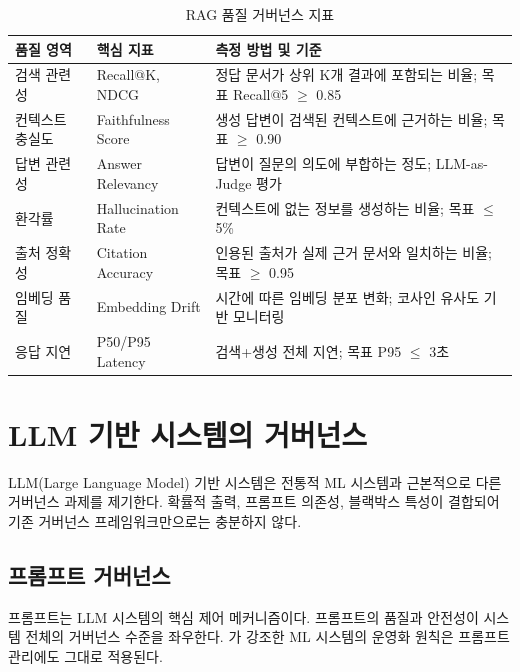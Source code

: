\begin{table}[htbp]
\centering
\caption{RAG 품질 거버넌스 지표}
\label{tab:rag_quality_metrics}
\begin{tabularx}{\textwidth}{p{3cm}p{3cm}X}
\toprule
\textbf{품질 영역} & \textbf{핵심 지표} & \textbf{측정 방법 및 기준} \\
\midrule
검색 관련성 & Recall@K, NDCG & 정답 문서가 상위 K개 결과에 포함되는 비율; 목표 Recall@5 $\geq$ 0.85 \\
\midrule
컨텍스트 충실도 & Faithfulness Score & 생성 답변이 검색된 컨텍스트에 근거하는 비율; 목표 $\geq$ 0.90 \\
\midrule
답변 관련성 & Answer Relevancy & 답변이 질문의 의도에 부합하는 정도; LLM-as-Judge 평가 \\
\midrule
환각률 & Hallucination Rate & 컨텍스트에 없는 정보를 생성하는 비율; 목표 $\leq$ 5\% \\
\midrule
출처 정확성 & Citation Accuracy & 인용된 출처가 실제 근거 문서와 일치하는 비율; 목표 $\geq$ 0.95 \\
\midrule
임베딩 품질 & Embedding Drift & 시간에 따른 임베딩 분포 변화; 코사인 유사도 기반 모니터링 \\
\midrule
응답 지연 & P50/P95 Latency & 검색+생성 전체 지연; 목표 P95 $\leq$ 3초 \\
\bottomrule
\end{tabularx}
\end{table}


\section{LLM 기반 시스템의 거버넌스}
\label{sec:13.5}

LLM(Large Language Model) 기반 시스템은 전통적 ML 시스템과 근본적으로 다른 거버넌스 과제를 제기한다. 확률적 출력, 프롬프트 의존성, 블랙박스 특성이 결합되어 기존 거버넌스 프레임워크만으로는 충분하지 않다.

\subsection{프롬프트 거버넌스}
\label{sec:13.5.1}

프롬프트는 LLM 시스템의 핵심 제어 메커니즘이다. 프롬프트의 품질과 안전성이 시스템 전체의 거버넌스 수준을 좌우한다. \cite{shankar2022operationalizing}가 강조한 ML 시스템의 운영화 원칙은 프롬프트 관리에도 그대로 적용된다.

